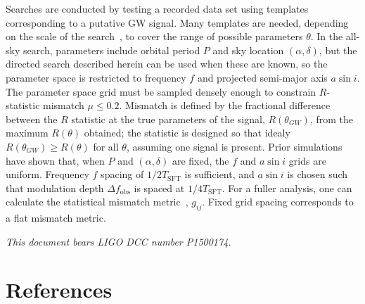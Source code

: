 \documentclass[12pt]{iopart}
\begin{document}
Searches are conducted by testing a recorded data set using templates corresponding to a putative GW signal.
Many templates are needed, depending on the scale of the search~\cite{GoetzTwoSpectMethods2011}, to cover the range of possible parameters $\theta$.
In the all-sky search, parameters include orbital period $P$ and sky location $(\alpha, \delta)$, but the directed search described herein can be used when these are known, so the parameter space is restricted to frequency $f$ and projected semi-major axis $a \sin i$.
The parameter space grid must be sampled densely enough to constrain $R$-statistic mismatch $\mu \leq 0.2$.
Mismatch is defined by the fractional difference between the $R$ statistic at the true parameters of the signal, $R(\theta_{GW})$, from the maximum $R(\theta)$ obtained; the statistic is designed so that idealy $R(\theta_{GW}) \geq R(\theta)$ for all $\theta$, assuming one signal is present.
Prior simulations have shown that, when $P$ and $(\alpha,\delta)$ are fixed, the $f$ and $a \sin i$ grids are uniform.
Frequency $f$ spacing of $1/2T_\mathrm{SFT}$ is sufficient, and $a \sin i$ is chosen such that modulation depth $\Delta f_\mathrm{obs}$ is spaced at $1/4T_\mathrm{SFT}$.
For a fuller analysis, one can calculate the statistical mismatch metric~\cite{Brady1998}, $g_{ij}$.
Fixed grid spacing corresponds to a flat mismatch metric.

\textit{This document bears LIGO DCC number P1500174.}

\section*{References}



%
\end{document}
